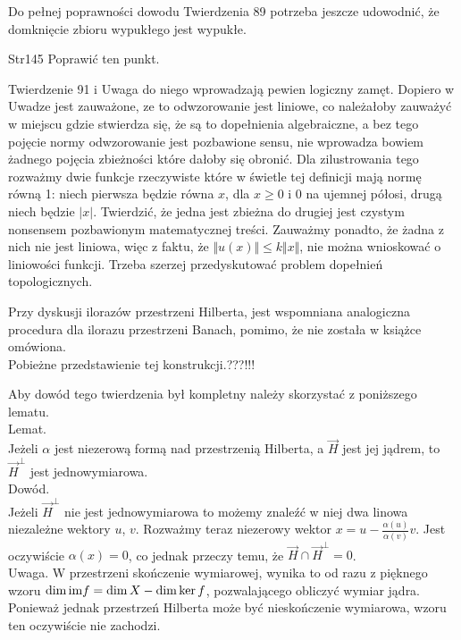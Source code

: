 \documentclass[a4paper,11pt]{article}
\begin{document}
\vspace{\spaceFour}


\start {} Do pełnej poprawności dowodu Twierdzenia 89 potrzeba
jeszcze udowodnić, że domknięcie zbioru wypukłego jest wypukłe.

\vspace{\spaceFour}


\start Str{145} Poprawić ten punkt.

\vspace{\spaceFour}


\start {} Twierdzenie 91 i Uwaga do niego wprowadzają pewien
logiczny zamęt. Dopiero w Uwadze jest zauważone, ze to odwzorowanie
jest liniowe, co należałoby zauważyć w miejscu gdzie stwierdza się, że
są to dopełnienia algebraiczne, a bez tego pojęcie normy odwzorowanie
jest pozbawione sensu, nie wprowadza bowiem żadnego pojęcia zbieżności
które dałoby się obronić. Dla zilustrowania tego rozważmy dwie funkcje
rzeczywiste które w świetle tej definicji mają normę równą 1: niech
pierwsza będzie równa $x$, dla $x \geq 0$ i 0 na ujemnej półosi, drugą
niech będzie $| x |$. Twierdzić, że jedna jest zbieżna do drugiej jest
czystym nonsensem pozbawionym matematycznej treści. Zauważmy ponadto,
że żadna z nich nie jest liniowa, więc z faktu, że
$\Vert u( x ) \Vert \leq k \Vert x \Vert$, nie można wnioskować o liniowości funkcji.
Trzeba szerzej przedyskutować problem dopełnień topologicznych.

\vspace{\spaceFour}


\start {} Przy dyskusji ilorazów przestrzeni Hilberta, jest
wspomniana analogiczna procedura dla ilorazu przestrzeni Banach,
pomimo, że nie została w książce omówiona. \\
Pobieżne przedstawienie tej konstrukcji.???!!!

\vspace{\spaceFour}


\start {} Aby dowód tego twierdzenia był kompletny należy
skorzystać z poniższego lematu. \\
Lemat. \\
Jeżeli $\alpha$ jest niezerową formą nad przestrzenią Hilberta, a
$\vec{ H }$
jest jej jądrem, to $\vec{ H }^{ \bot }$ jest jednowymiarowa. \\
Dowód. \\
Jeżeli $\vec{ H }^{ \bot }$ nie jest jednowymiarowa to możemy znaleźć w
niej dwa linowa niezależne wektory $u$, $v$. Rozważmy teraz niezerowy
wektor $x = u -\frac{ \alpha( u ) }{ \alpha( v ) }v$. Jest oczywiście
$\alpha( x ) = 0$,
co jednak przeczy temu, że $\vec{ H } \cap \vec{ H }^{ \bot } =  0$. \\
Uwaga. W przestrzeni skończenie wymiarowej, wynika to od razu z
pięknego wzoru $\dim\textrm{im} f = \dim X - \dim\ker f$, pozwalającego
obliczyć wymiar jądra. Ponieważ jednak przestrzeń Hilberta może być
nieskończenie wymiarowa, wzoru ten oczywiście nie zachodzi.
\end{document}
